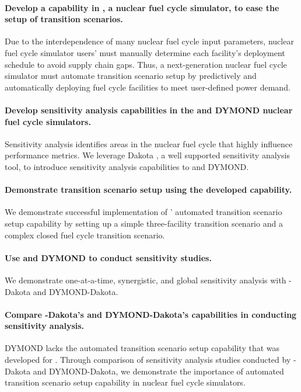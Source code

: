 \paragraph{Develop a capability in \Cyclus \cite{huff_fundamental_2016},
a nuclear fuel cycle simulator, to ease the setup of 
transition scenarios.}
Due to the interdependence of many nuclear fuel cycle input parameters, 
nuclear fuel cycle simulator users'
must manually determine each facility's deployment schedule 
to avoid supply chain gaps. 
Thus, a next-generation nuclear fuel cycle simulator must automate 
transition scenario setup by predictively and 
automatically deploying fuel cycle facilities to meet user-defined 
power demand. 

\paragraph{Develop sensitivity analysis capabilities in the \Cyclus and DYMOND 
nuclear fuel cycle simulators.}
Sensitivity analysis identifies areas in the nuclear fuel cycle
that highly influence performance metrics. 
We leverage Dakota \cite{eldred_dakota_2010}, a well supported sensitivity 
analysis tool, to introduce sensitivity analysis capabilities to 
\Cyclus and DYMOND.  

\paragraph{Demonstrate \Cyclus transition scenario setup using the 
developed capability.} 
We demonstrate successful implementation of \Cyclus' automated transition scenario 
setup capability by setting up a simple three-facility transition scenario and 
a complex closed fuel cycle transition scenario. 

\paragraph{Use \Cyclus and DYMOND to conduct sensitivity studies.}
We demonstrate one-at-a-time, synergistic, and global sensitivity analysis 
with \Cyclus-Dakota and DYMOND-Dakota. 

\paragraph{Compare \Cyclus-Dakota's and DYMOND-Dakota's capabilities in conducting sensitivity 
analysis.} 
DYMOND lacks the automated transition scenario setup capability that was developed for 
\Cyclus. 
Through comparison of sensitivity analysis studies conducted by \Cyclus-Dakota and 
DYMOND-Dakota, we demonstrate the importance of automated transition scenario setup 
capability in nuclear fuel cycle simulators.